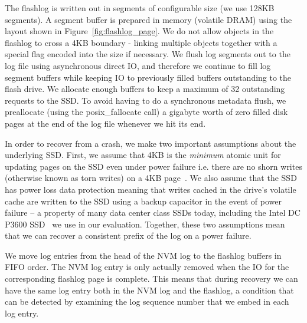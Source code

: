 \documentclass[letterpaper,twocolumn,10pt]{article}
\begin{document}
The flashlog is written out in segments of configurable size (we use 128KB
segments). A segment buffer is prepared in memory (volatile DRAM) using the
layout shown in Figure~\ref{fig:flashlog_page}. We do not allow objects in the
flashlog to cross a 4KB boundary - linking multiple objects together with a
special flag encoded into the size if necessary. We flush log segments out to
the log file using asynchronous direct IO, and therefore we continue to fill log
segment buffers while keeping IO to previously filled buffers outstanding to the
flash drive. We allocate enough buffers to keep a maximum of 32 outstanding
requests to the SSD. To avoid having to do a synchronous metadata flush, we
preallocate (using the posix\_fallocate call) a gigabyte worth of zero filled
disk pages at the end of the log file whenever we hit its end.

In order to recover from a crash, we make two important assumptions about the
underlying SSD. First, we assume that 4KB is the \emph{minimum} atomic unit for
updating pages on the SSD even under power failure i.e. there are no shorn
writes (otherwise known as torn writes) on a 4KB page~\cite{shorn_writes}. We
also assume that the SSD has power loss data protection meaning that writes
cached in the drive's volatile cache are written to the SSD using a backup
capacitor in the event of power failure -- a property of many data center class
SSDs today, including the Intel DC P3600 SSD~\cite{ssd_spec} we use in our
evaluation. Together, these two assumptions mean that we can recover a
consistent prefix of the log on a power failure.

We move log entries from the head of the NVM log to the flashlog buffers in FIFO
order. The NVM log entry is only actually removed when the IO for the
corresponding flashlog page is complete. This means that during recovery we can
have the same log entry both in the NVM log and the flashlog, a condition that
can be detected by examining the log sequence number that we embed in each log
entry.
\end{document}
